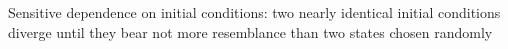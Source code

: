 \documentclass[aspectratio=169]{beamer}
\begin{document}
\begin{frame}
\begin{center}
%
\end{center}

\end{frame}
\begin{frame}
\frametitle{}

Sensitive dependence on initial conditions: two nearly identical initial conditions diverge until they bear not more resemblance than two states chosen randomly

\end{frame}
\end{document}
